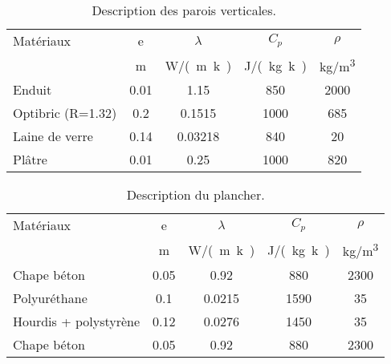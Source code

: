 \begin{table}
    \begin{tabular}{l *4{c}}
        \toprule
        Matériaux         & e         & $\lambda$      & $C_{p}$         & $\rho$          \\
                          & \si{m}  & \si{W/(m.k)} & \si{J/(kg.k)} & \si{kg/m^{3}} \\
        \midrule
        Enduit            & 0.01      & 1.15           & 850             & 2000            \\
        Optibric (R=1.32) & 0.2       & 0.1515         & 1000            & 685             \\
        Laine de verre    & 0.14      & 0.03218        & 840             & 20              \\
        Plâtre            & 0.01      & 0.25           & 1000            & 820             \\
        \bottomrule
    \end{tabular}
    \caption{Description des parois verticales.}
    \label{tab:compo_mur}
\end{table}

\begin{table}
    \begin{tabular}{l *4{c}}
        \toprule
        Matériaux              & e         & $\lambda$        & $C_{p}$         & $\rho$          \\
                               & \si{m}  & \si{W/(m.k)}   & \si{J/(kg.k)} & \si{kg/m^{3}} \\
        \midrule
        Chape béton            & 0.05      &  0.92            & 880             & 2300            \\
        Polyuréthane           & 0.1       &  0.0215          & 1590            & 35              \\
        Hourdis + polystyrène  & 0.12      &  0.0276          & 1450            & 35              \\
        Chape béton            & 0.05      &  0.92            & 880             & 2300            \\
        \bottomrule
    \end{tabular}
    \caption{Description du plancher.}
    \label{tab:compo_plancher}
\end{table}

